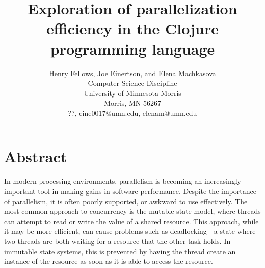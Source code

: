 \documentclass[12pt]{article}
\newcommand{\comment}[1]{{\bf \tt  {#1}}}
\begin{document}
\pagestyle{plain}
%




\title{Exploration of parallelization efficiency in the Clojure programming language}
%
%




\author{
Henry Fellows, Joe Einertson, and Elena Machkasova \\
Computer Science Discipline \\
University of Minnesota Morris\\
Morris, MN 56267\\
??, eine0017@umn.edu, elenam@umn.edu
}




\date{}




\maketitle
\thispagestyle{empty}


\section*{\centering Abstract}
In modern processing environments, parallelism is becoming an increasingly important tool in making gains in software performance. Despite the importance of parallelism, it is often poorly supported, or awkward to use effectively. The most common approach to concurrency is the mutable state model, where threads can attempt to read or write the value of a shared resource. This approach, while it may be more efficient, can cause problems such as deadlocking - a state where two threads are both waiting for a resource that the other task holds. In immutable state systems, this is prevented by having the thread create an instance of the resource as soon as it is able to access the resource.
\end{document}

